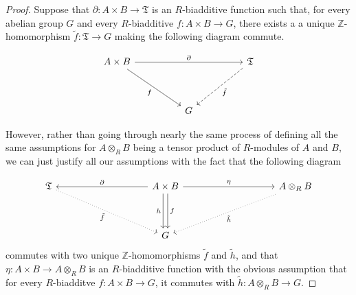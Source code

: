\documentclass[12pt,reqno]{amsart}
\theoremstyle{plain}
\newcommand{\zz}{\mathbb Z}
\begin{document}
\begin{proof} Suppose that $\partial \colon A \times B \to \mathfrak{T}$ is an $R$-biadditive function such that, for every abelian group $G$ and every $R$-biadditive $f \colon A \times B \to G$, there exists a a unique $\zz$-homomorphism $\tilde{f} \colon \mathfrak{T} \to G$ making the following diagram commute. 


\begin{center}
$$ \begin{tikzcd}
A \times B \arrow[rrrr, "\partial"] \arrow[rrdd, "f"'] &  &   &  & \mathfrak{T} \arrow[lldd, "\tilde{f}", dashed] \\
                                       &  &   &  &                             \\
                                       &  & G &  &                            
\end{tikzcd}$$ 
\end{center}


However, rather than going through nearly the same process of defining all the same assumptions for $A \otimes_R B$ being a tensor product of $R$-modules of $A$ and $B$, we can just justify all our assumptions with the fact that the following diagram 

$$\begin{tikzcd}
\mathfrak{T} \arrow[rrrrdd, "\tilde{f}"', dotted] &  &  &  & A\times B \arrow[rrrr, "\eta"] \arrow[llll, "\partial"'] \arrow[dd, "h"', shift right] \arrow[dd, "f", shift left] &  &  &  & A \otimes_R B \arrow[lllldd, "\tilde{h}", dotted] \\
                               &  &  &  &                                                                                                  &  &  &  &                               \\
                               &  &  &  & G                                                                                                &  &  &  &                              
\end{tikzcd}$$ 
commutes with two unique $\zz$-homomorphisms $\tilde{f}$ and $\tilde{h}$, and that $\eta \colon A \times B \to A \otimes_R B$ is an $R$-biadditive function with the obvious assumption that for every $R$-biadditve $f \colon A \times B \to G$, it commutes with $\tilde{h} \colon A \otimes_R B \to G$. 


\end{proof}
\end{document}
